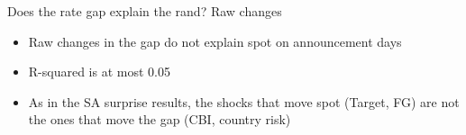 \documentclass[
  ignorenonframetext,
  aspectratio=141,
]{beamer}
\providecommand{\tightlist}{%
  \setlength{\itemsep}{0pt}\setlength{\parskip}{0pt}}\usepackage{longtable,booktabs,array}
\begin{document}
\begin{frame}{Does the rate gap explain the rand? Raw changes}
\label{does-the-rate-gap-explain-the-rand-raw-changes}
\begin{table}[!h]
\centering\begingroup\fontsize{10}{12}\selectfont

\endgroup{}
\end{table}

\vspace{0.3cm}

\begin{itemize}
\tightlist
\item
  Raw changes in the gap do not explain spot on announcement days
\item
  R-squared is at most 0.05
\item
  As in the SA surprise results, the shocks that move spot (Target, FG)
  are not the ones that move the gap (CBI, country risk)
\end{itemize}
\end{frame}
\end{document}
